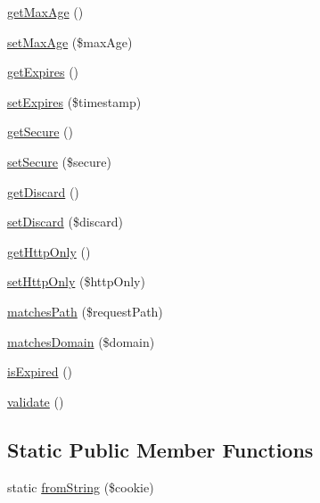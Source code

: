 \begin{DoxyCompactItemize}
\item 
\hyperlink{classGuzzleHttp_1_1Cookie_1_1SetCookie_a89083ab85d1ab58beeb2f25985d8392b}{get\+Max\+Age} ()
\item 
\hyperlink{classGuzzleHttp_1_1Cookie_1_1SetCookie_aeb2f0adfeb501acea1c705b5fb7b9815}{set\+Max\+Age} (\$max\+Age)
\item 
\hyperlink{classGuzzleHttp_1_1Cookie_1_1SetCookie_af83a5ce0986c7de8924651d8d1891544}{get\+Expires} ()
\item 
\hyperlink{classGuzzleHttp_1_1Cookie_1_1SetCookie_a501b5a9b3f987136dc86bb54a85924d9}{set\+Expires} (\$timestamp)
\item 
\hyperlink{classGuzzleHttp_1_1Cookie_1_1SetCookie_a969745d97d9bcc4c4667d7d7e87203f5}{get\+Secure} ()
\item 
\hyperlink{classGuzzleHttp_1_1Cookie_1_1SetCookie_a38e312f1d5db24393399e7463d8918a5}{set\+Secure} (\$secure)
\item 
\hyperlink{classGuzzleHttp_1_1Cookie_1_1SetCookie_ac6b3f111c8b7f606a12466ca0d6e5e6f}{get\+Discard} ()
\item 
\hyperlink{classGuzzleHttp_1_1Cookie_1_1SetCookie_af2bc6875f2bcb84e6faa6f21c0d1b176}{set\+Discard} (\$discard)
\item 
\hyperlink{classGuzzleHttp_1_1Cookie_1_1SetCookie_ab5c33c7ec467dbdbfbfaa439df5f71aa}{get\+Http\+Only} ()
\item 
\hyperlink{classGuzzleHttp_1_1Cookie_1_1SetCookie_ade5a595a5e0deeee6bad4897511b1a3d}{set\+Http\+Only} (\$http\+Only)
\item 
\hyperlink{classGuzzleHttp_1_1Cookie_1_1SetCookie_af9b53dc34cbf781d766782dce05b86c0}{matches\+Path} (\$request\+Path)
\item 
\hyperlink{classGuzzleHttp_1_1Cookie_1_1SetCookie_acecd9c6bca820c4e89714cd35e82e64f}{matches\+Domain} (\$domain)
\item 
\hyperlink{classGuzzleHttp_1_1Cookie_1_1SetCookie_aec8249340e7d893aeb7157e8d443f402}{is\+Expired} ()
\item 
\hyperlink{classGuzzleHttp_1_1Cookie_1_1SetCookie_a37795fbc25a1dde09afaded419f8fb18}{validate} ()
\end{DoxyCompactItemize}
\subsection*{Static Public Member Functions}
\begin{DoxyCompactItemize}
\item 
static \hyperlink{classGuzzleHttp_1_1Cookie_1_1SetCookie_abeedb44de09de9e5e8324140a626ee79}{from\+String} (\$cookie)
\end{DoxyCompactItemize}


